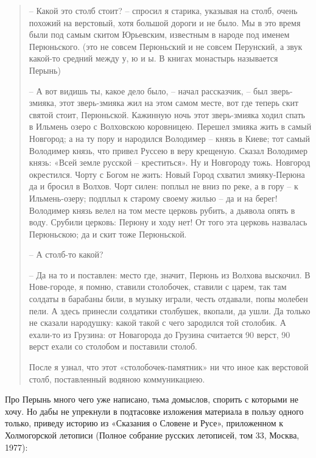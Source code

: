 \begin{quotation}
 – Какой это столб стоит?  – спросил я старика, указывая на столб, очень похожий на верстовый, хотя большой дороги и не было. Мы в это время были под самым скитом Юрьевским, известным в народе под именем Перюньского. (это не совсем Перюньский и не совсем Перунский, а звук какой-то средний между у, ю и ы. В книгах монастырь называется Перынь)

 – А вот видишь ты, какое дело было,  – начал рассказчик,  – был зверь-змияка, этот зверь-змияка жил на этом самом месте, вот где теперь скит святой стоит, Перюньской. Кажинную ночь этот зверь-змияка ходил спать в Ильмень озеро с Волховскою коровницею. Перешел змияка жить в самый Новгород; а на ту пору и народился Володимер –  князь в Киеве; тот самый Володимер князь, что привел Руссею в веру крещеную. Сказал Володимер князь: «Всей земле русской – креститься». Ну и Новгороду тожь. Новгород окрестился. Чорту с Богом не жить: Новый Город схватил змияку-Перюна да и бросил в Волхов. Чорт силен: поплыл не вниз по реке, а в гору – к Ильмень-озеру; подплыл к старому своему жилью – да и на берег! Володимер князь велел на том месте церковь рубить, а дьявола опять в воду. Срубили церковь: Перюну и ходу нет! От того эта церковь назвалась Перюньскою; да и скит тоже Перюньской.

 – А столб-то какой?

 – Да на то и поставлен: место где, значит, Перюнь из Волхова выскочил. В Нове-городе, я помню, ставили столобочек, ставили с царем, так там солдаты в барабаны били, в музыку играли, честь отдавали, попы молебен пели. А здесь принесли солдатики столбушек, вкопали, да ушли. Да только не сказали народушку: какой такой с чего зародился той столобик. А ехали-то из Грузина: от Новагорода до Грузина считается 90 верст, 90 верст ехали со столобом и поставили столоб.

После я узнал, что этот «столобочек-памят\-ник» ни что иное как верстовой столб, поставленный водяною коммуникациею.
\end{quotation}

Про Перынь много чего уже написано, тьма домыслов, спорить с которыми не хочу. Но дабы не упрекнули в подтасовке изложения материала в пользу одного только, приведу историю из «Сказания о Словене и Русе», приложенном к Холмогорской летописи (Полное собрание русских летописей, том 33, Москва, 1977):

